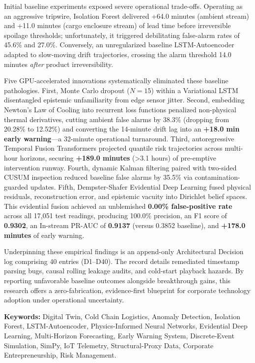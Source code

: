 \documentclass[11pt,a4paper,oneside]{report}
\begin{document}
Initial baseline experiments exposed severe operational trade-offs. Operating as an aggressive tripwire, Isolation Forest delivered +64.0 minutes (ambient stream) and +11.0 minutes (cargo enclosure stream) of lead time before irreversible spoilage thresholds; unfortunately, it triggered debilitating false-alarm rates of 45.6\% and 27.0\%. Conversely, an unregularized baseline LSTM-Autoencoder adapted to slow-moving drift trajectories, crossing the alarm threshold 14.0 minutes \emph{after} product irreversibility.

Five GPU-accelerated innovations systematically eliminated these baseline pathologies. First, Monte Carlo dropout ($N=15$) within a Variational LSTM disentangled epistemic unfamiliarity from edge sensor jitter. Second, embedding Newton's Law of Cooling into recurrent loss functions penalized non-physical thermal derivatives, cutting ambient false alarms by 38.3\% (dropping from 20.28\% to 12.52\%) and converting the 14-minute drift lag into an \textbf{+18.0 min early warning}---a 32-minute operational turnaround. Third, autoregressive Temporal Fusion Transformers projected quantile risk trajectories across multi-hour horizons, securing \textbf{+189.0 minutes} (>3.1 hours) of pre-emptive intervention runway. Fourth, dynamic Kalman filtering paired with two-sided CUSUM inspection reduced baseline false alarms by 35.5\% via contamination-guarded updates. Fifth, Dempster-Shafer Evidential Deep Learning fused physical residuals, reconstruction error, and epistemic vacuity into Dirichlet belief spaces. This evidential fusion achieved an unblemished \textbf{0.00\% false-positive rate} across all 17,051 test readings, producing 100.0\% precision, an F1 score of \textbf{0.9302}, an In-stream PR-AUC of \textbf{0.9137} (versus 0.3852 baseline), and \textbf{+178.0 minutes} of early warning.

Underpinning these empirical findings is an append-only Architectural Decision log comprising 40 entries (D1--D40). The record details remediated timestamp parsing bugs, causal rolling leakage audits, and cold-start playback hazards. By reporting unfavorable baseline outcomes alongside breakthrough gains, this research offers a zero-fabrication, evidence-first blueprint for corporate technology adoption under operational uncertainty.

\textbf{Keywords:} Digital Twin, Cold Chain Logistics, Anomaly Detection, Isolation Forest, LSTM-Autoencoder, Physics-Informed Neural Networks, Evidential Deep Learning, Multi-Horizon Forecasting, Early Warning System, Discrete-Event Simulation, SimPy, IoT Telemetry, Structural-Proxy Data, Corporate Entrepreneurship, Risk Management.
\end{document}
